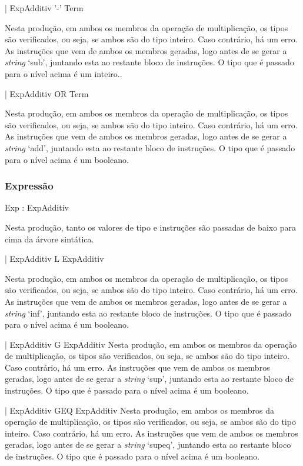 | ExpAdditiv '-' Term  

Nesta  produção, em ambos os membros da operação de multiplicação, os tipos são
verificados, ou seja, se ambos são do tipo inteiro. Caso contrário, há um erro.
As instruções que vem de ambos os membros geradas, logo antes de se gerar
a \emph{string} `sub', juntando esta ao restante bloco de instruções. 
O tipo que é passado para o nível acima é um inteiro..

  
| ExpAdditiv OR  Term  

Nesta  produção, em ambos os membros da operação de multiplicação, os tipos são
verificados, ou seja, se ambos são do tipo inteiro. Caso contrário, há um erro.
As instruções que vem de ambos os membros geradas, logo antes de se gerar
a \emph{string} `add', juntando esta ao restante bloco de instruções. 
O tipo que é passado para o nível acima é um  booleano.

\subsubsection{Expressão}

Exp : ExpAdditiv            

Nesta produção, tanto os valores de tipo e instruções são passadas de baixo para
cima da árvore sintática.
 
|  ExpAdditiv L   ExpAdditiv

Nesta  produção, em ambos os membros da operação de multiplicação, os tipos são
verificados, ou seja, se ambos são do tipo inteiro. Caso contrário, há um erro.
As instruções que vem de ambos os membros geradas, logo antes de se gerar
a \emph{string} `inf', juntando esta ao restante bloco de instruções. O tipo que
é passado para o nível acima é um  booleano.

|  ExpAdditiv G   ExpAdditiv
Nesta  produção, em ambos os membros da operação de multiplicação, os tipos são
verificados, ou seja, se ambos são do tipo inteiro. Caso contrário, há um erro.
As instruções que vem de ambos os membros geradas, logo antes de se gerar
a \emph{string} `sup', juntando esta ao restante bloco de instruções. O tipo que
é passado para o nível acima é um  booleano.


  
|  ExpAdditiv GEQ ExpAdditiv
Nesta  produção, em ambos os membros da operação de multiplicação, os tipos são
verificados, ou seja, se ambos são do tipo inteiro. Caso contrário, há um erro.
As instruções que vem de ambos os membros geradas, logo antes de se gerar
a \emph{string} `supeq', juntando esta ao restante bloco de instruções. O tipo que
é passado para o nível acima é um  booleano.


